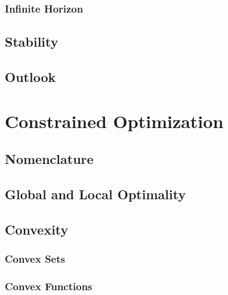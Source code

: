             \subsubsection{Infinite Horizon} %

        \subsection{Stability} %

        \subsection{Outlook} %

    \section{Constrained Optimization} %

        \subsection{Nomenclature} %

        \subsection{Global and Local Optimality} %

        \subsection{Convexity} %

            \subsubsection{Convex Sets} %

            \subsubsection{Convex Functions} %

